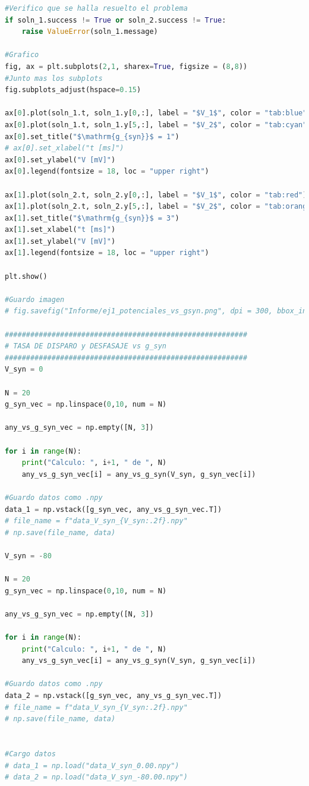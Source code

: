 \documentclass[aps,prb,twocolumn,superscriptaddress,floatfix,longbibliography]{revtex4-2}
\begin{document}
\begin{lstlisting}[language=Python]
#Verifico que se halla resuelto el problema
if soln_1.success != True or soln_2.success != True:
    raise ValueError(soln_1.message)

#Grafico
fig, ax = plt.subplots(2,1, sharex=True, figsize = (8,8))
#Junto mas los subplots
fig.subplots_adjust(hspace=0.15)

ax[0].plot(soln_1.t, soln_1.y[0,:], label = "$V_1$", color = "tab:blue")
ax[0].plot(soln_1.t, soln_1.y[5,:], label = "$V_2$", color = "tab:cyan")
ax[0].set_title("$\mathrm{g_{syn}}$ = 1")
# ax[0].set_xlabel("t [ms]")
ax[0].set_ylabel("V [mV]")
ax[0].legend(fontsize = 18, loc = "upper right")

ax[1].plot(soln_2.t, soln_2.y[0,:], label = "$V_1$", color = "tab:red")
ax[1].plot(soln_2.t, soln_2.y[5,:], label = "$V_2$", color = "tab:orange")
ax[1].set_title("$\mathrm{g_{syn}}$ = 3")
ax[1].set_xlabel("t [ms]")
ax[1].set_ylabel("V [mV]")
ax[1].legend(fontsize = 18, loc = "upper right")

plt.show()

#Guardo imagen
# fig.savefig("Informe/ej1_potenciales_vs_gsyn.png", dpi = 300, bbox_inches = "tight")

#########################################################
# TASA DE DISPARO y DESFASAJE vs g_syn
#########################################################
V_syn = 0

N = 20
g_syn_vec = np.linspace(0,10, num = N)

any_vs_g_syn_vec = np.empty([N, 3])

for i in range(N):
    print("Calculo: ", i+1, " de ", N)
    any_vs_g_syn_vec[i] = any_vs_g_syn(V_syn, g_syn_vec[i])

#Guardo datos como .npy
data_1 = np.vstack([g_syn_vec, any_vs_g_syn_vec.T])
# file_name = f"data_V_syn_{V_syn:.2f}.npy"
# np.save(file_name, data)

V_syn = -80

N = 20
g_syn_vec = np.linspace(0,10, num = N)

any_vs_g_syn_vec = np.empty([N, 3])

for i in range(N):
    print("Calculo: ", i+1, " de ", N)
    any_vs_g_syn_vec[i] = any_vs_g_syn(V_syn, g_syn_vec[i])

#Guardo datos como .npy
data_2 = np.vstack([g_syn_vec, any_vs_g_syn_vec.T])
# file_name = f"data_V_syn_{V_syn:.2f}.npy"
# np.save(file_name, data)


#Cargo datos
# data_1 = np.load("data_V_syn_0.00.npy")
# data_2 = np.load("data_V_syn_-80.00.npy")


\end{lstlisting}
\end{document}
